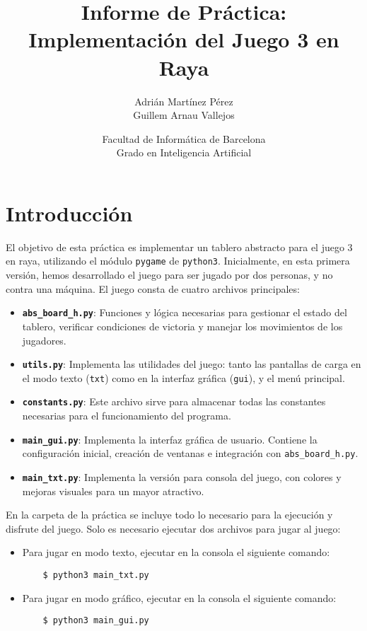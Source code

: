 \documentclass[a4paper,12pt]{article}
\title{Informe de Práctica: Implementación del Juego 3 en Raya}
\author{Adrián Martínez Pérez \\ Guillem Arnau Vallejos}
\date{Facultad de Informática de Barcelona\\Grado en Inteligencia Artificial}
\begin{document}
\maketitle

\section*{Introducción}
El objetivo de esta práctica es implementar un tablero abstracto para el juego 3 en raya, utilizando el módulo \texttt{pygame} de \texttt{python3}. Inicialmente, en esta primera versión, hemos desarrollado el juego para ser jugado por dos personas, y no contra una máquina. El juego consta de cuatro archivos principales:

\begin{itemize}
    \item \textbf{\texttt{abs\_board\_h.py}}: Funciones y lógica necesarias para gestionar el estado del tablero, verificar condiciones de victoria y manejar los movimientos de los jugadores.
    \item \textbf{\texttt{utils.py}}: Implementa las utilidades del juego: tanto las pantallas de carga en el modo texto (\texttt{txt}) como en la interfaz gráfica (\texttt{gui}), y el menú principal.
    \item \textbf{\texttt{constants.py}}: Este archivo sirve para almacenar todas las constantes necesarias para el funcionamiento del programa.
    \item \textbf{\texttt{main\_gui.py}}: Implementa la interfaz gráfica de usuario. Contiene la configuración inicial, creación de ventanas e integración con \texttt{abs\_board\_h.py}.
    \item \textbf{\texttt{main\_txt.py}}: Implementa la versión para consola del juego, con colores y mejoras visuales para un mayor atractivo.
\end{itemize}

En la carpeta de la práctica se incluye todo lo necesario para la ejecución y disfrute del juego. Solo es necesario ejecutar dos archivos para jugar al juego:

\begin{itemize}
    \item Para jugar en modo texto, ejecutar en la consola el siguiente comando:
    \begin{verbatim}
    $ python3 main_txt.py
    \end{verbatim}
    \item Para jugar en modo gráfico, ejecutar en la consola el siguiente comando:
    \begin{verbatim}
    $ python3 main_gui.py
    \end{verbatim}
\end{itemize}
\end{document}
